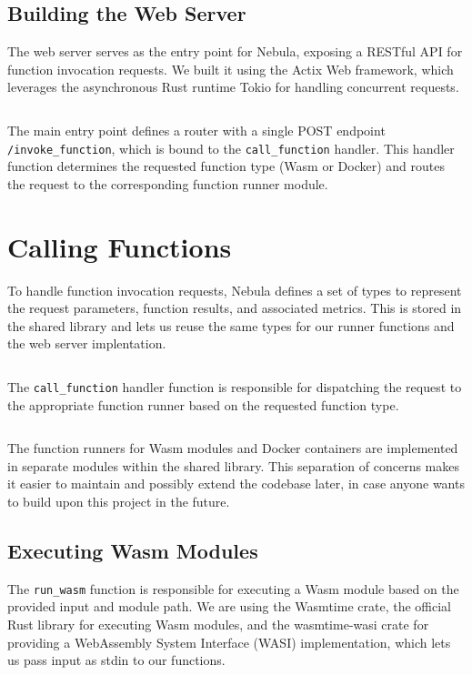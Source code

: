 \documentclass[
  table]{report}
\begin{document}
\subsection{Building the Web Server}

The web server serves as the entry point for Nebula, exposing a RESTful
API for function invocation requests. We built it using the Actix Web
framework, which leverages the asynchronous Rust runtime Tokio for
handling concurrent requests.

\inputminted{rust}{assets/code/web_server.rs}

The main entry point defines a router with a single POST endpoint
\texttt{/invoke\_function}, which is bound to the
\texttt{call\_function} handler. This handler function determines the
requested function type (Wasm or Docker) and routes the request to the
corresponding function runner module.

\section{Calling Functions}

To handle function invocation requests, Nebula defines a set of types to
represent the request parameters, function results, and associated
metrics. This is stored in the shared library and lets us reuse the same
types for our runner functions and the web server implentation.

\inputminted{rust}{assets/code/nebula_types.rs}

The \texttt{call\_function} handler function is responsible for
dispatching the request to the appropriate function runner based on the
requested function type.

\inputminted{rust}{assets/code/call_function.rs}

The function runners for Wasm modules and Docker containers are
implemented in separate modules within the shared library. This
separation of concerns makes it easier to maintain and possibly extend
the codebase later, in case anyone wants to build upon this project in
the future.

\subsection{Executing \ac{Wasm} Modules}

The \texttt{run\_wasm} function is responsible for executing a Wasm
module based on the provided input and module path. We are using the
Wasmtime crate, the official Rust library for executing Wasm modules,
and the wasmtime-wasi crate for providing a WebAssembly System Interface
(WASI) implementation, which lets us pass input as stdin to our
functions.
\end{document}
